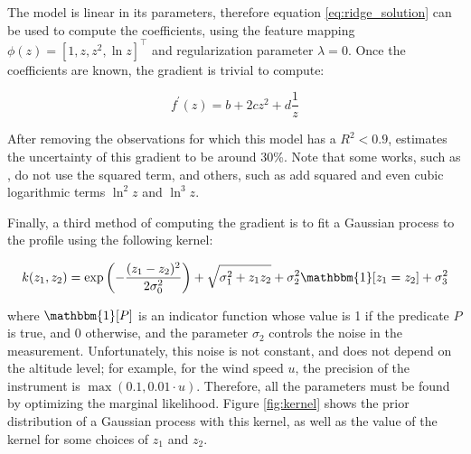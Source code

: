 \documentclass[a4paper,11pt]{kth-mag}
\begin{document}
The model is linear in its parameters, therefore equation \ref{eq:ridge_solution} can be used to compute the coefficients, using the feature mapping $\phi(z)=\left[1,z,z^2,\ln z\right]^\intercal$ and regularization parameter $\lambda=0$. Once the coefficients are known, the gradient is trivial to compute:

\begin{equation}
\label{eq:log_gradient}
f^\prime(z)=b+2cz^2+d\frac{1}{z}
\end{equation}

After removing the observations for which this model has a $R^2<0.9$, \cite{windlogprofile} estimates the uncertainty of this gradient to be around 30\%. Note that some works, such as \cite{windprof_nosqr}, do not use the squared term, and others, such as \cite{flux_vs_gradient_abl_depth} add squared and even cubic logarithmic terms $\ln^2z$ and $\ln^3z$.

Finally, a third method of computing the gradient is to fit a Gaussian process to the profile using the following kernel:

\begin{equation}
\label{eq:kernel}
k(z_1,z_2)=\exp\left(-\frac{(z_1-z_2)^2}{2\sigma_0^2}\right)+\sqrt{\sigma_1^2+ z_1 z_2}+\sigma_2^2 \mathbbm{1}[z_1=z_2]+\sigma_3^2
\end{equation}

\noindent where $\mathbbm{1}[P]$ is an indicator function whose value is 1 if the predicate $P$ is true, and 0 otherwise, and the parameter $\sigma_2$ controls the noise in the measurement. Unfortunately, this noise is not constant, and does not depend on the altitude level; for example, for the wind speed $u$, the precision of the instrument is $\max(0.1,0.01\cdot u)$. Therefore, all the parameters must be found by optimizing the marginal likelihood. Figure \ref{fig:kernel} shows the prior distribution of a Gaussian process with this kernel, as well as the value of the kernel for some choices of $z_1$ and $z_2$.
\end{document}
